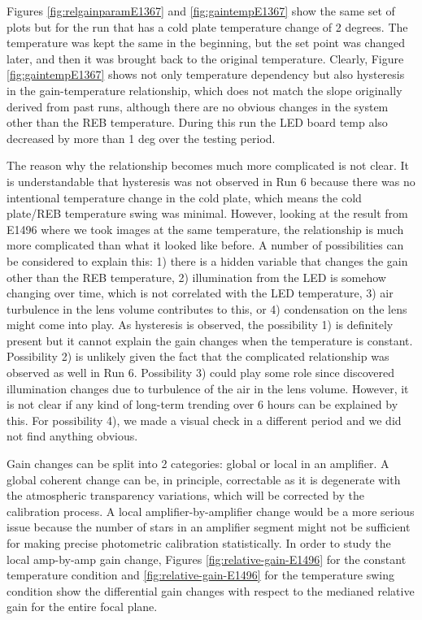 Figures \ref{fig:relgainparamE1367} and \ref{fig:gaintempE1367} show the same set of plots but for the run that has a cold plate temperature change of 2 degrees.
The temperature was kept the same in the beginning, but the set point was changed later, and then it was brought back to the original temperature. 
Clearly, Figure \ref{fig:gaintempE1367} shows not only temperature dependency but also hysteresis in the gain-temperature relationship, which does not match the slope originally derived from past runs, although there are no obvious changes in the system other than the REB temperature.
During this run the LED board temp also decreased by more than 1 deg over the testing period.


The reason why the relationship becomes much more complicated is not clear. It is understandable that hysteresis was not observed in Run 6 because there was no intentional temperature change in the cold plate, which means the cold plate/REB temperature swing was minimal. However, looking at the result from E1496 where we took images at the same temperature, the relationship is much more complicated than what it looked like before. A number of possibilities can be considered to explain this: 1) there is a hidden variable that changes the gain other than the REB temperature, 2) illumination from the LED is somehow changing over time, which is not correlated with the LED temperature, 3) air turbulence in the lens volume contributes to this, or 4) condensation on the lens might come into play. As hysteresis is observed, the possibility 1) is definitely present but it cannot explain the gain changes when the temperature is constant. Possibility 2) is unlikely given the fact that the complicated relationship was observed as well in Run 6. Possibility 3) could play some role since \citet{2024arXiv241113386B} discovered illumination changes due to turbulence of the air in the lens volume. However, it is not clear if any kind of long-term trending over 6 hours can be explained by this. For possibility 4), we made a visual check in a different period and we did not find anything obvious. 

Gain changes can be split into 2 categories: global or local in an amplifier.  A global coherent change can be, in principle, correctable as it is degenerate with the atmospheric transparency variations, which will be corrected by the calibration process. A local amplifier-by-amplifier change would be a more serious issue because the number of stars in an amplifier segment might not be sufficient for making precise photometric calibration statistically. In order to study the local amp-by-amp gain change, Figures \ref{fig:relative-gain-E1496} for the constant temperature condition and \ref{fig:relative-gain-E1496} for the temperature swing condition show the differential gain changes with respect to the medianed relative gain for the entire focal plane. %

